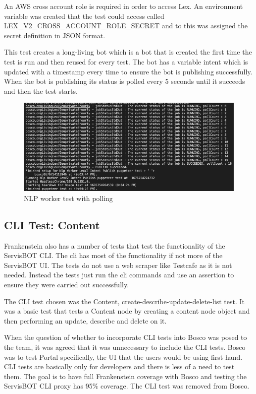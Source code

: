 \documentclass[12pt,a4paper,titlepage]{report}
\begin{document}
An AWS cross account role is required in order to access Lex. An environment variable was created that the test could access called LEX\_V2\_CROSS\_ACCOUNT\_ROLE\_SECRET and to this was assigned the secret definition in JSON format. 

This test creates a long-living bot which is a bot that is created the first time the test is run and then reused for every test. 
The bot has a variable intent which is updated with a timestamp every time to ensure the bot is publishing successfully. 
When the bot is publishing its status is polled every 5 seconds until it succeeds and then the test starts.

\begin{figure}[H]
 \centering
 \includegraphics[width=15cm]{./diagrams/nlp_worker_poll.png}
 \caption{NLP worker test with polling}
\end{figure}

\subsection{CLI Test: Content}
Frankenstein also has a number of tests that test the functionality of the ServisBOT CLI. The cli has most of the functionality if not more of the ServisBOT UI. 
The tests do not use a web scraper like Testcafe as it is not needed. 
Instead the tests just run the cli commands and use an assertion to ensure they were carried out successfully. 

The CLI test chosen was the Content, create-describe-update-delete-list test. It was a basic test that tests a Content node by creating a content node object and then performing an update, describe and delete on it.

When the question of whether to incorporate CLI tests into Bosco was posed to the team, it was agreed that it was unnecessary to include the CLI tests. Bosco was to test Portal specifically, the UI that the users would 
be using first hand. CLI tests are basically only for developers and there is less of a need to test them. The goal is to have full Frankenstein coverage with Bosco and testing the ServisBOT CLI proxy has 95\% coverage. 
The CLI test was removed from Bosco.
\end{document}
